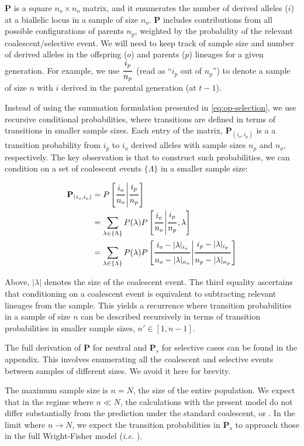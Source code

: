 \documentclass[review]{elsarticle}
\newcommand{\ra}{\rightarrow}
\newcommand{\Dfrac}[2]{%
  \ooalign{%
    $\genfrac{}{}{1.2pt}0{#1}{#2}$\cr%
    $\color{white}\genfrac{}{}{.4pt}0{\phantom{#1}}{\phantom{#2}}$}%
}
\newcommand{\cond}{\middle\vert}
\begin{document}
$\mathbf{P}$ is a square $n_o \times n_o$ matrix, and it enumerates the number of derived alleles
($i$) at a biallelic locus in a sample of size $n_o$. $\mathbf{P}$ includes contributions from
all possible configurations of parents $n_p$, weighted by the probability of the relevant
coalescent/selective event. We will need to keep track of sample size and number of derived alleles
in the offspring ($o$) and parents ($p$) lineages for a given generation. For example, we use
$\Dfrac{i_p}{n_p}$ (read as ``$i_p$ out of $n_p$'') to denote a sample of size $n$ with $i$ derived in
the parental generation (at $t-1$).

Instead of using the summation formulation presented in \eqref{eq:op-selection}, we use recursive
conditional probabilities, where transitions are defined in terms of transitions in smaller
sample sizes. Each entry of the matrix, $\mathbf{P}_{(i_o,i_p)}$ is a a transition probability from
$i_p$ to $i_o$ derived alleles with sample sizes $n_p$ and $n_o$, respectively. The key observation
is that to construct such probabilities, we can condition on a set of coalescent events
$\{\Lambda\}$ in a smaller sample size:

\begin{align*}
  \label{eq:coal-recursion}
  \mathbf{P}_{(i_o,i_p)} &= P\left[\Dfrac{i_o}{n_o} \cond \Dfrac{i_p}{n_p}\right] \\
  &= \sum_{\lambda\in\{\Lambda\}}P(\lambda)
  P\left[\Dfrac{i_o}{n_o} \cond \Dfrac{i_p}{n_p},\lambda\right] \\
  &= \sum_{\lambda\in\{\Lambda\}}P(\lambda)
  P\left[\Dfrac{i_o-|\lambda|_{i_o}}{n_o-|\lambda|_{n_o}} \cond \Dfrac{i_p-|\lambda|_{i_p}}{n_p-|\lambda|_{n_p}}\right]
\end{align*}

Above, $|\lambda|$ denotes the size of the coalescent event. The third equality ascertains that
conditioning on a coalescent event is equivalent to subtracting relevant lineages from the sample.
This yields a recurrence where transition probabilities in a sample of size $n$ can be
described recursively in terms of transition probabilities in smaller sample sizes, $n' \in [1, n-1]$.

The full derivation of $\mathbf{P}$ for neutral and $\mathbf{P}_s$ for selective cases can be found
in the appendix. This involves enumerating all the coalescent and selective events between samples of
different sizes. We avoid it here for brevity.

The maximum sample size is $n=N$, the size of the entire population. We expect that in the regime
where $n\ll N$, the calculations with the present model do not differ substantially from the
prediction under the standard coalescent, or \citep{JouganousEtAl2017}. In the limit where
$n \ra N$, we expect the transition probabilities in $\mathbf{P}_s$ to approach those in the full
Wright-Fisher model (\textit{i.e.} \cite[eq. 1.58]{Ewens2004}).
\end{document}
